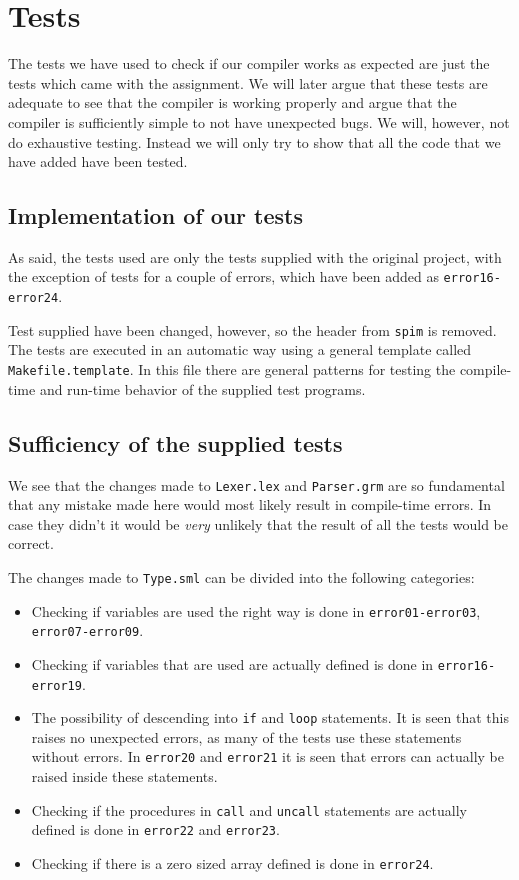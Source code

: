 \section{Tests}

The tests we have used to check if our compiler works as expected are
just the tests which came with the assignment. We will later argue that
these tests are adequate to see that the compiler is working properly 
and argue that the compiler is sufficiently simple to not have unexpected bugs. 
We will, however, not do exhaustive testing. Instead we will only try to show 
that all the code that we have added have been tested.

\subsection{Implementation of our tests}
As said, the tests used are only the tests supplied with the original project,
with the exception of tests for a couple of errors, which have been added as
{\tt error16-error24}.

Test supplied have been changed, however, so the header from {\tt spim} is
removed. The tests are executed in an automatic way using a general template
called {\tt Makefile.template}. In this file there are general patterns for
testing the compile-time and run-time behavior of the supplied test programs.

\subsection{Sufficiency of the supplied tests}
We see that the changes made to {\tt Lexer.lex} and {\tt Parser.grm} are
so fundamental that any mistake made here would most likely result in
compile-time errors. In case they didn't it would be \emph{very} unlikely
that the result of all the tests would be correct.

The changes made to {\tt Type.sml} can be divided into the following categories:
\begin{itemize}
\item Checking if variables are used the right way is done in {\tt error01-error03}, {\tt error07-error09}.
\item Checking if variables that are used are actually defined is done in {\tt error16-error19}.
\item The possibility of descending into {\tt if} and {\tt loop} statements.
      It is seen that this raises no unexpected errors, as many of the tests use
      these statements without errors. In {\tt error20} and {\tt error21} it is
      seen that errors can actually be raised inside these statements.
\item Checking if the procedures in {\tt call} and {\tt uncall} statements are actually
      defined is done in {\tt error22} and {\tt error23}.
\item Checking if there is a zero sized array defined is done in {\tt error24}.
\end{itemize}

